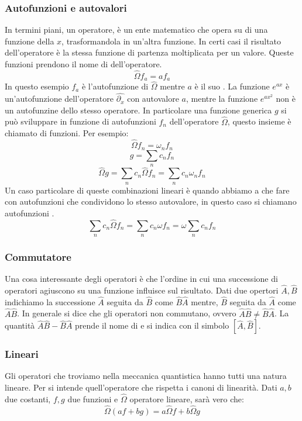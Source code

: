 \subsubsection{Autofunzioni e autovalori}
In termini piani, un operatore, è un ente matematico che opera su di una funzione della $x$, trasformandola in un'altra funzione. In certi casi il risultato dell'operatore è la stessa funzione di partenza moltiplicata per un valore. Queste funzioni prendono il nome di  dell'operatore.
$$\hat{\Omega} f_a = a f_a$$
In questo esempio $f_a$ è l'autofunzione di $\hat{\Omega}$ mentre $a$ è il suo . La funzione $e^{ax}$ è un'autofunzione dell'operatore $\hat{\partial{}_x}$ con autovalore $a$, mentre la funzione $e^{ax^2}$ non è un autofunzine dello stesso operatore. In particolare una funzione generica $g$ si può sviluppare in funzione di autofunzioni $f_n$ dell'operatore $\hat{\Omega}$, questo insieme è chiamato  di funzioni. Per esempio:
$$\hat{\Omega} f_n = \omega_n f_n$$
$$g = \sum_n c_n f_n$$
$$\hat{\Omega} g = \sum_n c_n \hat{\Omega} f_n = \sum_n c_n \omega_n f_n$$
Un caso particolare di queste combinazioni lineari è quando abbiamo a che fare con autofunzioni che condividono lo stesso autovalore, in questo caso si chiamano autofunzioni .
$$\sum_n c_n \hat{\Omega} f_n = \sum_n c_n \omega f_n = \omega \sum_n c_n f_n$$

\subsubsection{Commutatore}
Una cosa interessante degli operatori è che l'ordine in cui una successione di operatori agiuscono su una funzione influisce sul risultato. Dati due opertori $\hat{A}, \hat{B}$ indichiamo la successione $\hat{A}$ seguita da $\hat{B}$ come $\hat{B}\hat{A}$ mentre, $\hat{B}$ seguita da $\hat{A}$ come $\hat{A}\hat{B}$.
In generale si dice che gli operatori non commutano, ovvero $\hat{A}\hat{B} \ne \hat{B}\hat{A}$. La quantità $\hat{A}\hat{B} - \hat{B}\hat{A}$ prende il nome di  e si indica con il simbolo $[\hat{A},\hat{B}]$.

\subsubsection{Lineari}
Gli operatori che troviamo nella meccanica quantistica hanno tutti una natura lineare. Per  si intende quell'operatore che rispetta i canoni di linearità. Dati $a, b$ due costanti, $f, g$ due funzioni e $\hat{\Omega}$ operatore lineare, sarà vero che:
$$\hat{\Omega}( af + bg ) = a \hat{\Omega} f + b \hat{\Omega} g$$

